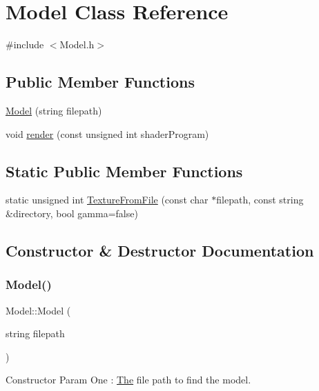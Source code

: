 \hypertarget{class_model}{}\section{Model Class Reference}
\label{class_model}


{\ttfamily \#include $<$Model.\+h$>$}

\subsection*{Public Member Functions}
\begin{DoxyCompactItemize}
\item 
\mbox{\hyperlink{class_model_a4a90abd11a1c4e47f1b704e28e147dfb}{Model}} (string filepath)
\item 
void \mbox{\hyperlink{class_model_a0885da76930d0f3b919eaa10ae08e8ab}{render}} (const unsigned int shader\+Program)
\end{DoxyCompactItemize}
\subsection*{Static Public Member Functions}
\begin{DoxyCompactItemize}
\item 
static unsigned int \mbox{\hyperlink{class_model_a16c263d87f6368d21d5ab255468c2c90}{Texture\+From\+File}} (const char $\ast$filepath, const string \&directory, bool gamma=false)
\end{DoxyCompactItemize}


\subsection{Constructor \& Destructor Documentation}
\mbox{\label{class_model_a4a90abd11a1c4e47f1b704e28e147dfb}} 
\subsubsection{\texorpdfstring{Model()}{Model()}}
{\footnotesize\ttfamily Model\+::\+Model (\begin{DoxyParamCaption}\item[{string}]{filepath }\end{DoxyParamCaption})}

Constructor Param One \+: \mbox{\hyperlink{class_the}{The}} file path to find the model. 

